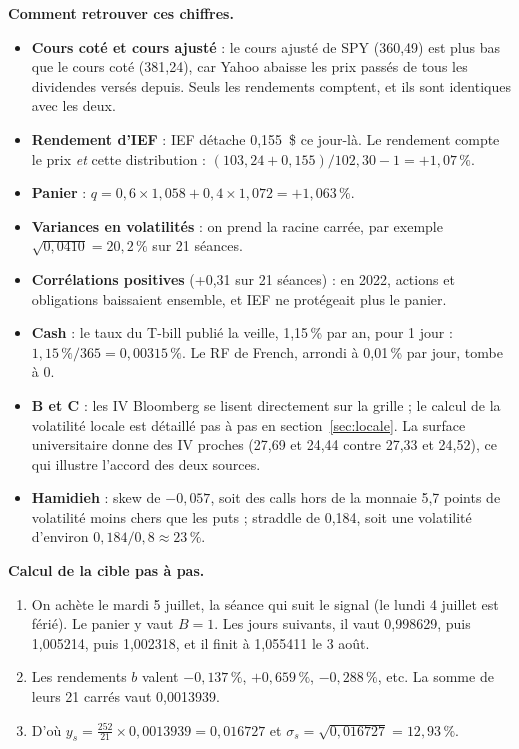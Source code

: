\documentclass[10pt,a4paper]{article}
\begin{document}
\textbf{Comment retrouver ces chiffres.}
\begin{itemize}[nosep,leftmargin=*]
  \item \textbf{Cours coté et cours ajusté} : le cours ajusté de SPY (360,49) est plus bas que le cours coté (381,24), car Yahoo abaisse les prix passés de tous les dividendes versés depuis. Seuls les rendements comptent, et ils sont identiques avec les deux.
  \item \textbf{Rendement d'IEF} : IEF détache 0,155~\$ ce jour-là. Le rendement compte le prix \emph{et} cette distribution : $(103{,}24+0{,}155)/102{,}30-1=+1{,}07\,\%$.
  \item \textbf{Panier} : $q=0{,}6\times1{,}058+0{,}4\times1{,}072=+1{,}063\,\%$.
  \item \textbf{Variances en volatilités} : on prend la racine carrée, par exemple $\sqrt{0{,}0410}=20{,}2\,\%$ sur 21 séances.
  \item \textbf{Corrélations positives} (+0,31 sur 21 séances) : en 2022, actions et obligations baissaient ensemble, et IEF ne protégeait plus le panier.
  \item \textbf{Cash} : le taux du T-bill publié la veille, 1,15\,\% par an, pour 1 jour : $1{,}15\,\%/365=0{,}00315\,\%$. Le RF de French, arrondi à 0,01\,\% par jour, tombe à 0.
  \item \textbf{B et C} : les IV Bloomberg se lisent directement sur la grille ; le calcul de la volatilité locale est détaillé pas à pas en section~\ref{sec:locale}. La surface universitaire donne des IV proches (27,69 et 24,44 contre 27,33 et 24,52), ce qui illustre l'accord des deux sources.
  \item \textbf{Hamidieh} : skew de $-0{,}057$, soit des calls hors de la monnaie 5,7 points de volatilité moins chers que les puts ; straddle de 0,184, soit une volatilité d'environ $0{,}184/0{,}8\approx23\,\%$.
\end{itemize}

\textbf{Calcul de la cible pas à pas.}
\begin{enumerate}[nosep,leftmargin=*]
\item On achète le mardi 5 juillet, la séance qui suit le signal (le lundi 4 juillet est férié). Le panier y vaut $B=1$. Les jours suivants, il vaut 0,998629, puis 1,005214, puis 1,002318, et il finit à 1,055411 le 3 août.
\item Les rendements $b$ valent $-0{,}137\,\%$, $+0{,}659\,\%$, $-0{,}288\,\%$, etc. La somme de leurs 21 carrés vaut 0,0013939.
\item D'où $y_s=\frac{252}{21}\times0{,}0013939=0{,}016727$ et $\sigma_s=\sqrt{0{,}016727}=12{,}93\,\%$.
\end{enumerate}
\end{document}
